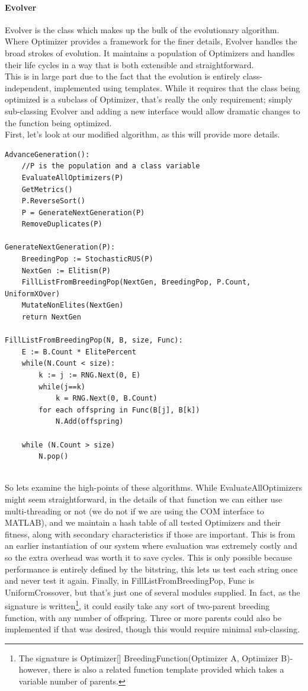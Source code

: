 \paragraph{Evolver}
Evolver is the class which makes up the bulk of the evolutionary algorithm.  Where Optimizer provides a framework for the finer details, Evolver handles the broad strokes of evolution.  It maintains a population of Optimizers and handles their life cycles in a way that is both extensible and straightforward.  \\This is in large part due to the fact that the evolution is entirely class-independent, implemented using templates. While it requires that the class being optimized is a subclass of Optimizer, that's really the only requirement; simply sub-classing Evolver and adding a new interface would allow dramatic changes to the function being optimized.\\First, let's look at our modified algorithm, as this will provide more details.
\begin{lstlisting}[caption= {Evolver Algorithm}, label = {fig:evolverAlgorithm}]
AdvanceGeneration():
	//P is the population and a class variable 
	EvaluateAllOptimizers(P)
	GetMetrics()
	P.ReverseSort()
	P = GenerateNextGeneration(P)
	RemoveDuplicates(P)

GenerateNextGeneration(P):
	BreedingPop := StochasticRUS(P)
	NextGen := Elitism(P)
	FillListFromBreedingPop(NextGen, BreedingPop, P.Count, UniformXOver)
	MutateNonElites(NextGen)
	return NextGen
	
FillListFromBreedingPop(N, B, size, Func):
	E := B.Count * ElitePercent
	while(N.Count < size):
		k := j := RNG.Next(0, E)
		while(j==k) 
			k = RNG.Next(0, B.Count)
		for each offspring in Func(B[j], B[k])
			N.Add(offspring)

	while (N.Count > size)
		N.pop()
	
\end{lstlisting}
So lets examine the high-points of these algorithms.  While EvaluateAllOptimizers might seem straightforward, in the details of that function we can either use multi-threading or not (we do not if we are using the COM interface to MATLAB), and we maintain a hash table of all tested Optimizers and their fitness, along with secondary characteristics if those are important.  This is from an earlier instantiation of our system where evaluation was extremely costly and so the extra overhead was worth it to save cycles. This is only possible because performance is entirely defined by the bitstring, this lets us test each string once and never test it again.  Finally, in FillListFromBreedingPop,  Func is UniformCrossover, but that's just one of several modules supplied.  In fact, as the signature is written\footnote{The signature is Optimizer[] BreedingFunction(Optimizer A, Optimizer B)- however, there is also a related function template provided which takes a variable number of parents.}, it could easily take any sort of two-parent breeding function, with any number of offspring.  Three or more parents could also be implemented if that was desired, though this would require minimal sub-classing.\\
